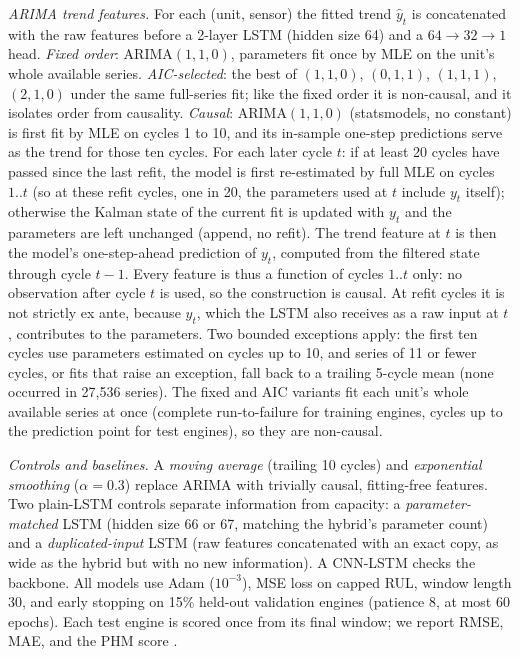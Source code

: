 \documentclass[conference]{IEEEtran}
\begin{document}
\emph{ARIMA trend features.} For each (unit, sensor) the fitted trend $\hat{y}_t$ is concatenated with the raw features before a 2-layer LSTM (hidden size 64) \cite{lstm1997} and a $64{\to}32{\to}1$ head. \emph{Fixed order}: ARIMA$(1,1,0)$, parameters fit once by MLE on the unit's whole available series. \emph{AIC-selected}: the best of $(1,1,0)$, $(0,1,1)$, $(1,1,1)$, $(2,1,0)$ under the same full-series fit; like the fixed order it is non-causal, and it isolates order from causality. \emph{Causal}: ARIMA$(1,1,0)$ (statsmodels, no constant) is first fit by MLE on cycles 1 to 10, and its in-sample one-step predictions serve as the trend for those ten cycles. For each later cycle $t$: if at least 20 cycles have passed since the last refit, the model is first re-estimated by full MLE on cycles $1..t$ (so at these refit cycles, one in 20, the parameters used at $t$ include $y_t$ itself); otherwise the Kalman state of the current fit is updated with $y_t$ and the parameters are left unchanged (append, no refit). The trend feature at $t$ is then the model's one-step-ahead prediction of $y_t$, computed from the filtered state through cycle $t-1$. Every feature is thus a function of cycles $1..t$ only: no observation after cycle $t$ is used, so the construction is causal. At refit cycles it is not strictly ex ante, because $y_t$, which the LSTM also receives as a raw input at $t$, contributes to the parameters. Two bounded exceptions apply: the first ten cycles use parameters estimated on cycles up to 10, and series of 11 or fewer cycles, or fits that raise an exception, fall back to a trailing 5-cycle mean (none occurred in 27{,}536 series). The fixed and AIC variants fit each unit's whole available series at once (complete run-to-failure for training engines, cycles up to the prediction point for test engines), so they are non-causal.

\emph{Controls and baselines.} A \emph{moving average} (trailing 10 cycles) and \emph{exponential smoothing} ($\alpha=0.3$) replace ARIMA with trivially causal, fitting-free features. Two plain-LSTM controls separate information from capacity: a \emph{parameter-matched} LSTM (hidden size 66 or 67, matching the hybrid's parameter count) and a \emph{duplicated-input} LSTM (raw features concatenated with an exact copy, as wide as the hybrid but with no new information). A CNN-LSTM \cite{cnnlstm2024} checks the backbone. All models use Adam ($10^{-3}$), MSE loss on capped RUL, window length 30, and early stopping on 15\% held-out validation engines (patience 8, at most 60 epochs). Each test engine is scored once from its final window; we report RMSE, MAE, and the PHM score \cite{saxena2008}.
\end{document}
